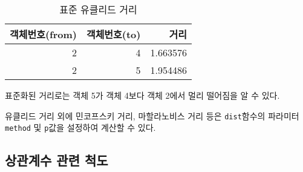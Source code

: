 \documentclass[]{book}
\newenvironment{Shaded}{\begin{snugshade}}{\end{snugshade}}
\newcommand{\DataTypeTok}[1]{\textcolor[rgb]{0.13,0.29,0.53}{#1}}
\newcommand{\DecValTok}[1]{\textcolor[rgb]{0.00,0.00,0.81}{#1}}
\newcommand{\KeywordTok}[1]{\textcolor[rgb]{0.13,0.29,0.53}{\textbf{#1}}}
\newcommand{\NormalTok}[1]{#1}
\newcommand{\OperatorTok}[1]{\textcolor[rgb]{0.81,0.36,0.00}{\textbf{#1}}}
\newcommand{\OtherTok}[1]{\textcolor[rgb]{0.56,0.35,0.01}{#1}}
\newcommand{\StringTok}[1]{\textcolor[rgb]{0.31,0.60,0.02}{#1}}
\begin{document}
\begin{Shaded}
\end{Shaded}

\begin{table}[t]

\caption{\label{tab:std-euclidean-dist}표준 유클리드 거리}
\centering
\begin{tabular}{rrr}
\toprule
객체번호(from) & 객체번호(to) & 거리\\
\midrule
2 & 4 & 1.663576\\
2 & 5 & 1.954486\\
\bottomrule
\end{tabular}
\end{table}

표준화된 거리로는 객체 5가 객체 4보다 객체 2에서 멀리 떨어짐을 알 수 있다.

유클리드 거리 외에 민코프스키 거리, 마할라노비스 거리 등은 \texttt{dist}함수의 파라미터 \texttt{method} 및 \texttt{p}값을 설정하여 계산할 수 있다.

\hypertarget{object-correlation-metric}{%
\subsection{상관계수 관련 척도}\label{object-correlation-metric}}
\end{document}
